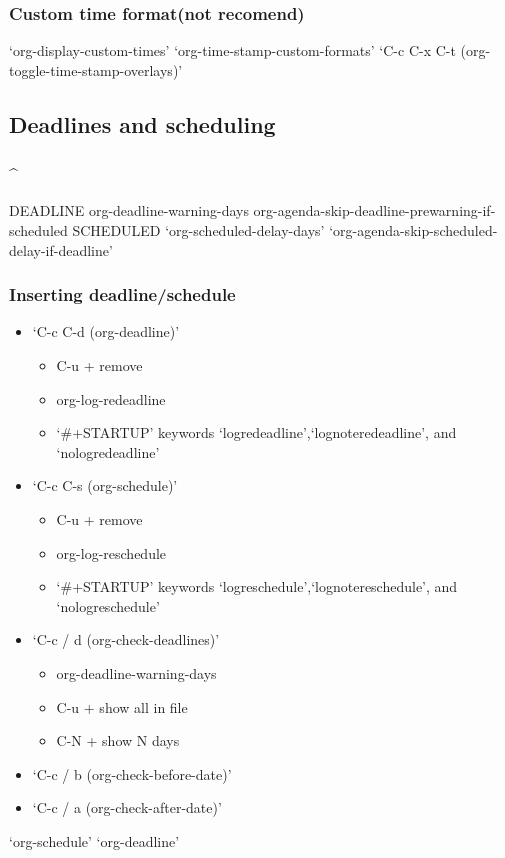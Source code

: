 \documentclass[11pt]{article}
\begin{document}
\subsubsection{Custom time format(not recomend)}
\label{sec:org51c56b2}
‘org-display-custom-times’
‘org-time-stamp-custom-formats’
‘C-c C-x C-t     (org-toggle-time-stamp-overlays)’
\subsection{Deadlines and scheduling}
\label{sec:org8cffed2}
\subsubsection{\^{}}
\label{sec:org1b20a56}
DEADLINE
org-deadline-warning-days
org-agenda-skip-deadline-prewarning-if-scheduled
SCHEDULED
‘org-scheduled-delay-days’
‘org-agenda-skip-scheduled-delay-if-deadline’
\subsubsection{Inserting deadline/schedule}
\label{sec:org7fe3b87}
\begin{itemize}
\item ‘C-c C-d     (org-deadline)’
\begin{itemize}
\item C-u +  remove
\item org-log-redeadline
\item ‘\#+STARTUP’ keywords ‘logredeadline’,‘lognoteredeadline’, and ‘nologredeadline’
\end{itemize}
\item ‘C-c C-s     (org-schedule)’
\begin{itemize}
\item C-u + remove
\item org-log-reschedule
\item ‘\#+STARTUP’ keywords ‘logreschedule’,‘lognotereschedule’, and ‘nologreschedule’
\end{itemize}
\item ‘C-c / d     (org-check-deadlines)’
\begin{itemize}
\item org-deadline-warning-days
\item C-u + show all in file
\item C-N + show N days
\end{itemize}
\item ‘C-c / b     (org-check-before-date)’
\item ‘C-c / a     (org-check-after-date)’
\end{itemize}
‘org-schedule’
‘org-deadline’
\end{document}

